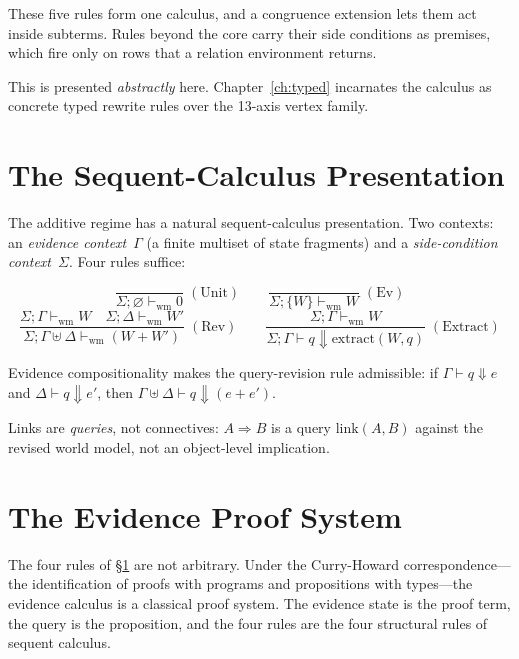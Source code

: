 \documentclass[11pt,openany]{report}
\begin{document}
\noindent
These five rules form one calculus, and a congruence extension lets them act
inside subterms.  Rules beyond the core carry their side conditions as
premises, which fire only on rows that a relation environment returns.

\noindent
This is presented \emph{abstractly} here.
Chapter~\ref{ch:typed} incarnates the calculus as
concrete typed rewrite rules over the 13-axis vertex family.


\section{The Sequent-Calculus Presentation}
\label{sec:sequent-calculus}

The additive regime has a natural sequent-calculus presentation.
Two contexts: an \emph{evidence context}~$\Gamma$ (a finite multiset
of state fragments) and a \emph{side-condition context}~$\Sigma$.
Four rules suffice:

\[
\frac{}{\Sigma; \varnothing \vdash_{\mathrm{wm}} 0} \;(\text{Unit})
\qquad
\frac{}{\Sigma; \{W\} \vdash_{\mathrm{wm}} W} \;(\text{Ev})
\]
\[
\frac{\Sigma; \Gamma \vdash_{\mathrm{wm}} W \quad
      \Sigma; \Delta \vdash_{\mathrm{wm}} W'}
     {\Sigma; \Gamma \uplus \Delta \vdash_{\mathrm{wm}} (W + W')}
\;(\text{Rev})
\qquad
\frac{\Sigma; \Gamma \vdash_{\mathrm{wm}} W}
     {\Sigma; \Gamma \vdash q \Downarrow \mathrm{extract}(W, q)}
\;(\text{Extract})
\]

\noindent
Evidence compositionality makes the query-revision rule admissible:
if $\Gamma \vdash q \Downarrow e$ and $\Delta \vdash q \Downarrow e'$,
then $\Gamma \uplus \Delta \vdash q \Downarrow (e + e')$.

Links are \emph{queries}, not connectives: $A \Rightarrow B$ is a
query $\mathrm{link}(A, B)$ against the revised world model, not an
object-level implication.


\section{The Evidence Proof System}
\label{sec:evidence-proof-system}

The four rules of \S\ref{sec:sequent-calculus} are not arbitrary.
Under the Curry-Howard correspondence---the identification of proofs
with programs and propositions with types---the evidence calculus is a
classical proof system.  The evidence state is the proof term, the
query is the proposition, and the four rules are the four structural
rules of sequent calculus.
\end{document}
